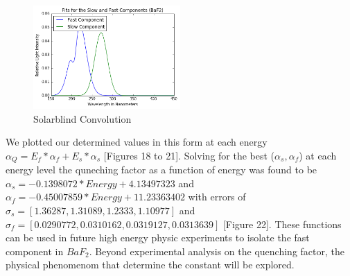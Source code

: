 \documentclass{article}
\begin{document}
\begin{figure}
  \centering
    \includegraphics[width=0.5\textwidth]{convsb.png}
  \caption{Solarblind Convolution}
  \label{fig:workflowedge}
\end{figure}

\noindent
We plotted our determined values in this form at each energy $\alpha_Q = E_f * \alpha_f + E_s * \alpha_s$ [Figures 18 to 21]. Solving for the best ($\alpha_s, \alpha_f$) at each energy level the quneching factor as a function of energy was found to be $\alpha_s = -0.1398072 * Energy + 4.13497323$ and $\alpha_f = -0.45007859 * Energy + 11.23363402$ with errors of $\sigma_s = [1.36287, 1.31089, 1.2333, 1.10977]$ and $\sigma_f = [0.0290772, 0.0310162, 0.0319127, 0.0313639]$ [Figure 22]. These functions can be used in future high energy physic experiments to isolate the fast component in $BaF_2$. Beyond experimental analysis on the quenching factor, the physical phenomenom that determine the constant will be explored. 
\end{document}
